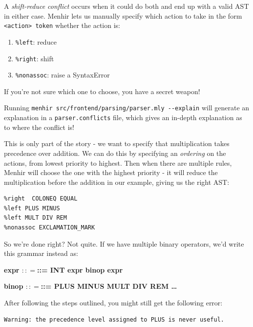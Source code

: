 A \emph{shift-reduce conflict} occurs when it could do both and end up
with a valid AST in either case. Menhir lets us manually specify which
action to take in the form
\texttt{\textless{}action\textgreater{}\ token} whether the action is:

\begin{enumerate}
\tightlist
\item
  \texttt{\%left}: reduce
\item
  \texttt{\%right}: shift
\item
  \texttt{\%nonassoc}: raise a SyntaxError
\end{enumerate}

If you're not sure which one to choose, you have a secret weapon!

Running \texttt{menhir\ src/frontend/parsing/parser.mly\ -\/-explain}
will generate an explanation in a \texttt{parser.conflicts} file, which
gives an in-depth explanation as to where the conflict is!

This is only part of the story - we want to specify that multiplication
takes precedence over addition. We can do this by specifying an
\emph{ordering} on the actions, from lowest priority to highest. Then
when there are multiple rules, Menhir will choose the one with the
highest priority - it will reduce the multiplication before the addition
in our example, giving us the right AST:

%

\begin{verbatim}
%right  COLONEQ EQUAL
%left PLUS MINUS
%left MULT DIV REM
%nonassoc EXCLAMATION_MARK
\end{verbatim}

So we're done right? Not quite. If we have multiple binary operators,
we'd write this grammar instead as:

\textbf{expr {{{\(:: =\)}{{{}{::=}}}}} \textbar{} INT \textbar{} expr
binop expr}

\textbf{binop {{{\(:: =\)}{{{}{::=}}}}} \textbar{} PLUS \textbar{} MINUS
\textbar{} MULT \textbar{} DIV \textbar{} REM \textbar{} \ldots{}}

After following the steps outlined, you might still get the following
error:


\begin{verbatim}
Warning: the precedence level assigned to PLUS is never useful.
\end{verbatim}

